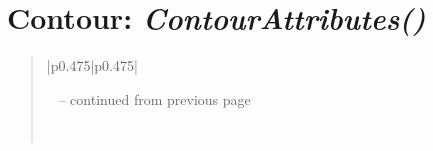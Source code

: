\documentclass[letterpaper,10pt,english]{sphinxmanual}
\begin{document}
\begin{DUlineblock}{0em}
\item[] 
\end{DUlineblock}

\begin{DUlineblock}{0em}
\item[] 
\end{DUlineblock}


\section{\textbf{Contour}: \emph{ContourAttributes()}}
\label{attributes:contour-contourattributes}
\begin{DUlineblock}{0em}
\item[] 
\end{DUlineblock}
\begin{quote}

\begin{longtable}{|p{0.475\linewidth}|p{0.475\linewidth}|}
\hline
\endfirsthead

%
{{\textsf{\tablename\ \thetable{} -- continued from previous page}}} \\
\hline
\endhead

\hline {} \\ \hline
\endfoot

\endlastfoot



\end{longtable}
\end{quote}
\end{document}
